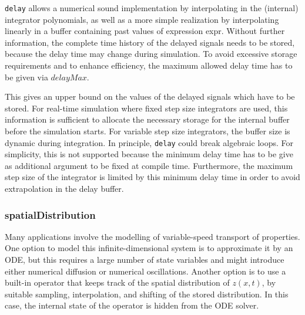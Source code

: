 \begin{nonnormative}
\lstinline!delay! allows a numerical sound
implementation by interpolating in the (internal) integrator
polynomials, as well as a more simple realization by interpolating
linearly in a buffer containing past values of expression expr. Without
further information, the complete time history of the delayed signals
needs to be stored, because the delay time may change during simulation.
To avoid excessive storage requirements and to enhance efficiency, the
maximum allowed delay time has to be given via $\mathit{delayMax}$.

This gives an upper bound on the values of the delayed signals
which have to be stored. For real-time simulation where fixed step size
integrators are used, this information is sufficient to allocate the
necessary storage for the internal buffer before the simulation starts.
For variable step size integrators, the buffer size is dynamic during
integration. In principle, \lstinline!delay! could break algebraic
loops. For simplicity, this is not supported because the minimum delay
time has to be give as additional argument to be fixed at compile time.
Furthermore, the maximum step size of the integrator is limited by this
minimum delay time in order to avoid extrapolation in the delay
buffer.
\end{nonnormative}

\subsubsection{spatialDistribution}\label{spatialdistribution}

\begin{nonnormative}
Many applications involve the modelling of variable-speed
transport of properties. One option to model this infinite-dimensional
system is to approximate it by an ODE, but this requires a large number
of state variables and might introduce either numerical diffusion or
numerical oscillations. Another option is to use a built-in operator
that keeps track of the spatial distribution of $z(x, t)$, by suitable
sampling, interpolation, and shifting of the stored distribution. In
this case, the internal state of the operator is hidden from the ODE
solver.
\end{nonnormative}

